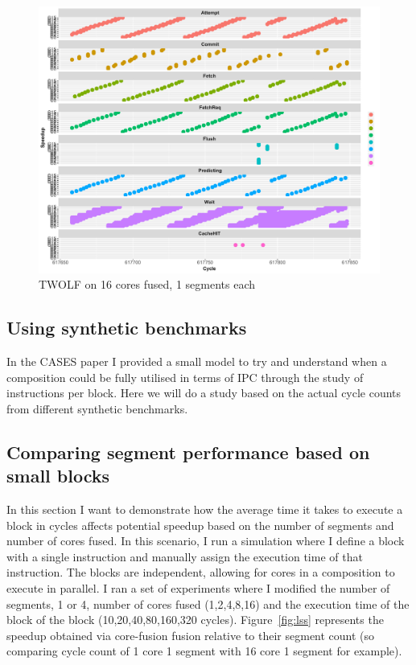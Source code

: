 \begin{figure}
\center
  \includegraphics[width=1\textwidth]{chapter3/graphics/twolf_16_1.pdf}
  \caption{TWOLF on 16 cores fused, 1 segments each}\label{fig:16step1}
\end{figure}
\newpage
\subsection{Using synthetic benchmarks}
In the CASES paper I provided a small model to try and understand when a composition could be fully utilised in terms of IPC through the study of instructions per block.
Here we will do a study based on the actual cycle counts from different synthetic benchmarks.

\subsection{Comparing segment performance based on small blocks}
In this section I want to demonstrate how the average time it takes to execute a block in cycles affects potential speedup based on the number of segments and number of cores fused. 
In this scenario, I run a simulation where I define a block with a single instruction and manually assign the execution time of that instruction.
The blocks are independent, allowing for cores in a composition to execute in parallel.
I ran a set of experiments where I modified the number of segments, 1 or 4, number of cores fused (1,2,4,8,16) and the execution time of the block of the block (10,20,40,80,160,320 cycles).
Figure~\ref{fig:lss} represents the speedup obtained via core-fusion fusion relative to their segment count (so comparing cycle count of 1 core 1 segment with 16 core 1 segment for example).

